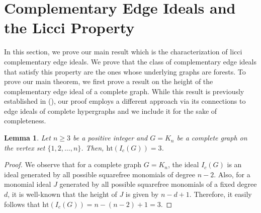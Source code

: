 \documentclass[oneside, 12pt]{amsart} \topmargin      -10mm \textwidth      160 true mm
\newtheorem{lem}[theorem]{Lemma}
\theoremstyle{definition}
\numberwithin{equation}{section}
\begin{document}
\section{Complementary Edge Ideals and the Licci Property}\label{S3}
    In this section, we prove our main result which is the characterization of licci complementary edge ideals. We prove that the class of complementary edge ideals that satisfy this property are the ones whose underlying graphs are forests. To prove our main theorem, we first prove a result on the height of the complementary edge ideal of a complete graph. While this result is previously established in (\cite[Corollary~2.3.]{ficarra2025complementary}), our proof employs a different approach via its connections to edge ideals of complete hypergraphs and we include it for the sake of completeness.  

\begin{lem}\label{lemma on height}
Let $n\geq 3$ be a positive integer and $G=K_n$ be a complete graph on the vertex set $\{1,2,\dots,n\}$. Then, $\mathrm{ht}(I_c(G))=3$.   
\end{lem}
\begin{proof}
 We observe that for a complete graph $G=K_n$, the ideal $I_c(G)$ is an ideal generated by all possible squarefree monomials of degree $n-2$. Also, for a monomial ideal $J$ generated by all possible squarefree monomials of a fixed degree $d$, it is well-known that the height of $J$ is given by $n-d+1$. Therefore, it easily follows that $\mathrm{ht}(I_c(G))=n-(n-2)+1=3$.     
\end{proof}
\end{document}
